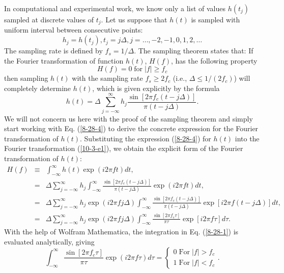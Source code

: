 \documentclass{article}
\newcommand{\tmop}[1]{\ensuremath{\operatorname{#1}}}
\begin{document}
In computational and experimental work, we know only a list of values $h
(t_j)$ sampled at discrete values of $t_j$. Let us suppose that $h (t)$ is
sampled with uniform interval between consecutive points:
\begin{equation}
  h_j = h (t_j), t_j = j \Delta, j = \ldots, - 2, - 1, 0, 1, 2, \ldots
\end{equation}
The sampling rate is defined by $f_s = 1 / \Delta$. The sampling theorem
states that: If the Fourier transformation of function $h (t)$, $H (f)$, has
the following property
\begin{equation}
  \label{8-28-3} H (f) = 0 \tmop{for} |f| \geqslant f_c
\end{equation}
then sampling $h (t)$ with the sampling rate $f_s \geqslant 2 f_c$ (i.e.,
$\Delta \leqslant 1 / (2 f_c)$) will completely determine $h (t)$, which is
given explicitly by the formula
\begin{equation}
  \label{8-28-4} h (t) = \Delta \sum_{j = - \infty}^{\infty} h_j \frac{\sin [2
  \pi f_c (t - j \Delta)]}{\pi (t - j \Delta)} .
\end{equation}
We will not concern us here with the proof of the sampling theorem and simply
start working with Eq. (\ref{8-28-4}) to derive the concrete expression for
the Fourier transformation of $h (t)$. Substituting the expression
(\ref{8-28-4}) for $h (t)$ into the Fourier transformation (\ref{10-3-e1}), we
obtain the explicit form of the Fourier transformation of $h (t)$:
\begin{eqnarray}
  H (f) & \equiv & \int_{- \infty}^{\infty} h (t) \exp (i 2 \pi f t) d t,
  \nonumber\\
  & = & \Delta \sum_{j = - \infty}^{\infty} h_j \int_{- \infty}^{\infty}
  \frac{\sin [2 \pi f_c (t - j \Delta)]}{\pi (t - j \Delta)} \exp (i 2 \pi f
  t) d t, \nonumber\\
  & = & \Delta \sum_{j = - \infty}^{\infty} h_j \exp (i 2 \pi f j \Delta)
  \int_{- \infty}^{\infty} \frac{\sin [2 \pi f_c (t - j \Delta)]}{\pi (t - j
  \Delta)} \exp [i 2 \pi f (t - j \Delta)] d t, \nonumber\\
  & = & \Delta \sum_{j = - \infty}^{\infty} h_j \exp (i 2 \pi f j \Delta)
  \int_{- \infty}^{\infty} \frac{\sin [2 \pi f_c \tau]}{\pi \tau} \exp [i 2
  \pi f \tau] d \tau .  \label{8-28-1}
\end{eqnarray}
With the help of Wolfram Mathematica, the integration in Eq. (\ref{8-28-1}) is
evaluated analytically, giving
\begin{equation}
  \int_{- \infty}^{\infty} \frac{\sin [2 \pi f_c \tau]}{\pi \tau} \exp (i 2
  \pi f \tau) d \tau = \left\{ \begin{array}{l}
    0 \tmop{For} |f| > f_c\\
    1 \tmop{For} |f| < f_c
  \end{array} . \right.
\end{equation}
\end{document}
